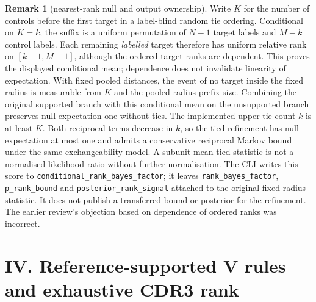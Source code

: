 \documentclass[10pt,a4paper]{article}
\theoremstyle{definition}
\newtheorem{remark}{Remark}
\newcommand{\code}[1]{\texttt{\small #1}}
\begin{document}
\begin{remark}[nearest-rank null and output ownership]\label{rem:ncrobligation}
Write $K$ for the number of controls before the first target in a label-blind random tie ordering.
Conditional on $K=k$, the suffix is a uniform permutation of $N-1$ target labels and $M-k$
control labels. Each remaining \emph{labelled} target therefore has uniform relative rank on
$[k+1,M+1]$, although the ordered target ranks are dependent. This proves the displayed
conditional mean; dependence does not invalidate linearity of expectation.
With fixed pooled distances, the event of no target inside the fixed radius is measurable from
$K$ and the pooled radius-prefix size. Combining the original supported branch with this
conditional mean on the unsupported branch preserves null expectation one without ties.
The implemented upper-tie count $k$ is at least $K$. Both reciprocal terms decrease in $k$,
so the tied refinement has null expectation at most one and admits a conservative reciprocal
Markov bound under the same exchangeability model. A subunit-mean tied statistic is not a
normalised likelihood ratio without further normalisation.
The CLI writes this score to \code{conditional\_rank\_bayes\_factor}; it leaves
\code{rank\_bayes\_factor}, \code{p\_rank\_bound} and \code{posterior\_rank\_signal} attached to
the original fixed-radius statistic. It does not publish a transferred bound or posterior for the
refinement. The earlier review's objection based on dependence of ordered ranks was incorrect.
\end{remark}

\part*{IV. Reference-supported V rules and exhaustive CDR3 rank}
\end{document}
